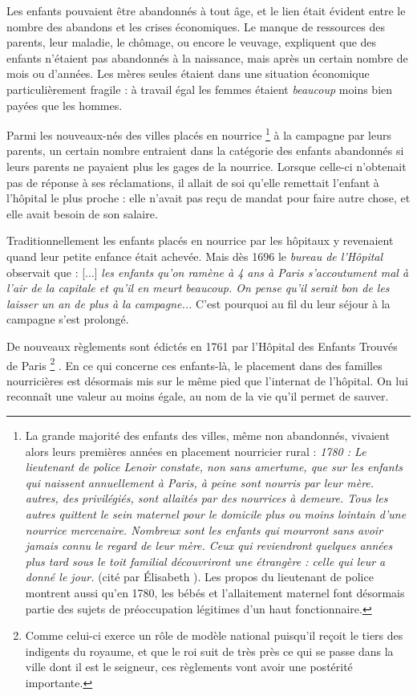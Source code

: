  Les enfants pouvaient être abandonnés à tout âge, et le lien était évident entre le nombre des abandons et les crises économiques. Le manque de ressources des parents, leur maladie, le chômage, ou encore le veuvage, expliquent que des enfants n'étaient pas abandonnés à la naissance, mais après un certain nombre de mois ou d'années. Les mères seules étaient dans une situation économique particulièrement fragile : à travail égal les femmes étaient \emph{beaucoup} moins bien payées que les hommes. 



 Parmi les nouveaux-nés des villes placés en nourrice%
\footnote{La grande majorité des enfants des villes, même non abandonnés, vivaient alors leurs premières années en placement nourricier rural : \emph{1780 : Le lieutenant de police Lenoir constate, non sans amertume, que sur les  enfants qui naissent annuellement à Paris,  à peine sont nourris par leur mère.  autres, des privilégiés, sont allaités par des nourrices à demeure. Tous les autres quittent le sein maternel pour le domicile plus ou moins lointain d'une nourrice mercenaire. Nombreux sont les enfants qui mourront sans avoir jamais connu le regard de leur mère. Ceux qui reviendront quelques années plus tard sous le toit familial découvriront une étrangère : celle qui leur a donné le jour.} (cité par Élisabeth ). Les propos du lieutenant de police montrent aussi qu'en 1780, les bébés et l'allaitement maternel font désormais partie des sujets de préoccupation légitimes d'un haut fonctionnaire.} 
à la campagne par leurs parents, un certain nombre entraient dans la catégorie des enfants abandonnés si leurs parents ne payaient plus les gages de la nourrice. Lorsque celle-ci n'obtenait pas de réponse à ses réclamations, il allait de soi qu'elle remettait l'enfant à l'hôpital le plus proche : elle n'avait pas reçu de mandat pour faire autre chose, et elle avait besoin de son salaire. 




 Traditionnellement les enfants placés en nourrice par les hôpitaux y revenaient quand leur petite enfance était achevée. Mais dès 1696 le \emph{bureau de l'Hôpital} observait que : [...] \emph{les enfants qu'on ramène à 4 ans à Paris s'accoutument mal à l'air de la capitale et qu'il en meurt beaucoup. On pense qu'il serait bon de les laisser un an de plus à la campagne...} C'est pourquoi au fil du  leur séjour à la campagne s'est prolongé.

 De nouveaux règlements sont édictés en 1761 par l'Hôpital des Enfants Trouvés de Paris%
\footnote{Comme celui-ci exerce un rôle de modèle national puisqu'il reçoit le tiers des indigents du royaume, et que le roi suit de très près ce qui se passe dans la ville dont il est le seigneur, ces règlements vont avoir une postérité importante.}%
. En ce qui concerne ces enfants-là, le placement dans des familles nourricières est désormais mis sur le même pied que l'internat de l'hôpital. On lui reconnaît une valeur au moins égale, au nom de la vie qu'il permet de sauver. 

